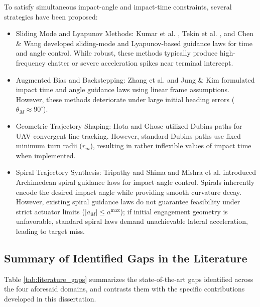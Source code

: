 To satisfy simultaneous impact-angle and impact-time constraints, several strategies have been proposed:
\begin{itemize}
    \item Sliding Mode and Lyapunov Methods: Kumar et al. \cite{kumar2012sliding}, Tekin et al. \cite{Tekin2016_IT}, and Chen \& Wang \cite{Chen2018JGCD} developed sliding-mode and Lyapunov-based guidance laws for time and angle control. While robust, these methods typically produce high-frequency chatter or severe acceleration spikes near terminal intercept.
    \item Augmented Bias and Backstepping: Zhang et al. \cite{zhang2013terminal, Zhang2015} and Jung \& Kim \cite{Jung2006} formulated impact time and angle guidance laws using linear frame assumptions. However, these methods deteriorate under large initial heading errors ($\theta_M \approx 90^\circ$).
    \item Geometric Trajectory Shaping: Hota and Ghose \cite{hota2009modified} utilized Dubins paths for UAV convergent line tracking. However, standard Dubins paths use fixed minimum turn radii ($r_m$), resulting in rather inflexible values of impact time when implemented.
    \item Spiral Trajectory Synthesis: Tripathy and Shima \cite{tripathy2019archimedean} and Mishra et al. \cite{mishra2024spiral} introduced Archimedean spiral guidance laws for impact-angle control. Spirals inherently encode the desired impact angle while providing smooth curvature decay. However, existing spiral guidance laws do not guarantee feasibility under strict actuator limits ($|a_M| \le a^{\text{max}}$); if initial engagement geometry is unfavorable, standard spiral laws demand unachievable lateral acceleration, leading to target miss.
\end{itemize}



\subsection{Summary of Identified Gaps in the Literature}
Table \ref{tab:literature_gaps} summarizes the state-of-the-art gaps identified across the four aforesaid domains, and contrasts them with the specific contributions developed in this dissertation.

